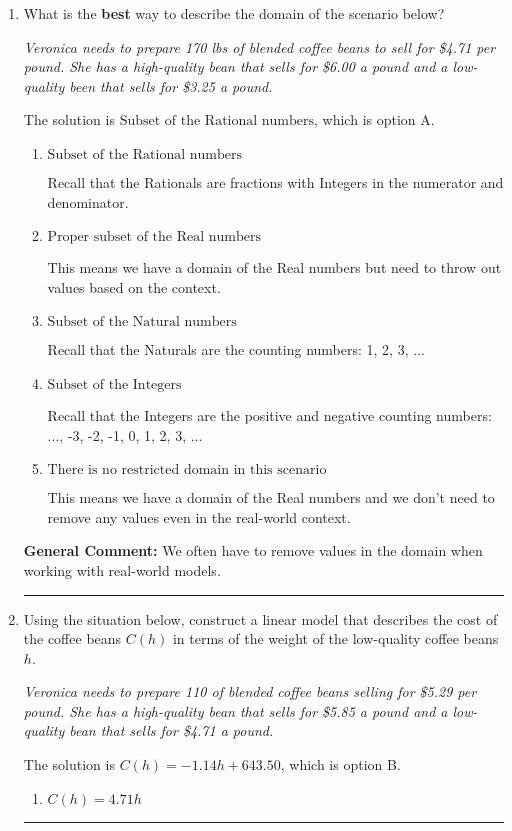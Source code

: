 \documentclass{extbook}[14pt]
\newcommand{\litem}[1]{\item #1

\rule{\textwidth}{0.4pt}}
\begin{document}
\begin{enumerate}\litem{
What is the \textbf{best} way to describe the domain of the scenario below?

\begin{center}
    \textit{ Veronica needs to prepare 170 lbs of blended coffee beans to sell for \$4.71 per pound. She has a high-quality bean that sells for \$6.00 a pound and a low-quality been that sells for \$3.25 a pound. }
\end{center}
The solution is \( \text{Subset of the Rational numbers} \), which is option A.\begin{enumerate}[label=\Alph*.]
\item \( \text{Subset of the Rational numbers} \)

Recall that the Rationals are fractions with Integers in the numerator and denominator.
\item \( \text{Proper subset of the Real numbers} \)

This means we have a domain of the Real numbers but need to throw out values based on the context.
\item \( \text{Subset of the Natural numbers} \)

Recall that the Naturals are the counting numbers: 1, 2, 3, ...
\item \( \text{Subset of the Integers} \)

Recall that the Integers are the positive and negative counting numbers: ..., -3, -2, -1, 0, 1, 2, 3, ... 
\item \( \text{There is no restricted domain in this scenario} \)

This means we have a domain of the Real numbers and we don't need to remove any values even in the real-world context.
\end{enumerate}

\textbf{General Comment:} We often have to remove values in the domain when working with real-world models.
}
\litem{
Using the situation below, construct a linear model that describes the cost of the coffee beans $C(h)$ in terms of the weight of the low-quality coffee beans $h$.

\begin{center}
    \textit{ Veronica needs to prepare 110 of blended coffee beans selling for \$5.29 per pound. She has a high-quality bean that sells for \$5.85 a pound and a low-quality bean that sells for \$4.71 a pound. }
\end{center}
The solution is \( C(h) = -1.14 h + 643.50 \), which is option B.\begin{enumerate}[label=\Alph*.]
\item \( C(h) = 4.71 h \)


\end{enumerate}}
\end{enumerate}
\end{document}
